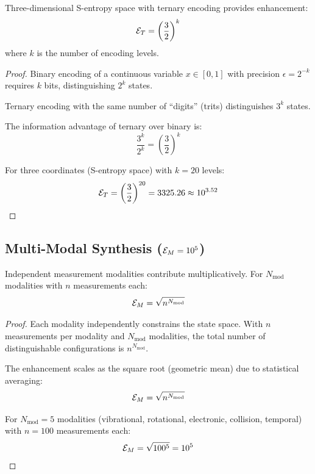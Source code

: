 \begin{theorem}
\label{thm:ternary}
Three-dimensional S-entropy space with ternary encoding provides enhancement:
\begin{equation}
\mathcal{E}_T = \left(\frac{3}{2}\right)^k
\end{equation}
where $k$ is the number of encoding levels.
\end{theorem}

\begin{proof}
Binary encoding of a continuous variable $x \in [0,1]$ with precision $\epsilon = 2^{-k}$ requires $k$ bits, distinguishing $2^k$ states.

Ternary encoding with the same number of ``digits'' (trits) distinguishes $3^k$ states.

The information advantage of ternary over binary is:
\begin{equation}
\frac{3^k}{2^k} = \left(\frac{3}{2}\right)^k
\end{equation}

For three coordinates (S-entropy space) with $k = 20$ levels:
\begin{equation}
\mathcal{E}_T = \left(\frac{3}{2}\right)^{20} = 3325.26 \approx 10^{3.52}
\end{equation}
\end{proof}

\subsection{Multi-Modal Synthesis ($\mathcal{E}_M = 10^{5}$)}

\begin{theorem}
\label{thm:multimodal}
Independent measurement modalities contribute multiplicatively. For $N_{\text{mod}}$ modalities with $n$ measurements each:
\begin{equation}
\mathcal{E}_M = \sqrt{n^{N_{\text{mod}}}}
\end{equation}
\end{theorem}

\begin{proof}
Each modality independently constrains the state space. With $n$ measurements per modality and $N_{\text{mod}}$ modalities, the total number of distinguishable configurations is $n^{N_{\text{mod}}}$.

The enhancement scales as the square root (geometric mean) due to statistical averaging:
\begin{equation}
\mathcal{E}_M = \sqrt{n^{N_{\text{mod}}}}
\end{equation}

For $N_{\text{mod}} = 5$ modalities (vibrational, rotational, electronic, collision, temporal) with $n = 100$ measurements each:
\begin{equation}
\mathcal{E}_M = \sqrt{100^5} = 10^5
\end{equation}
\end{proof}

